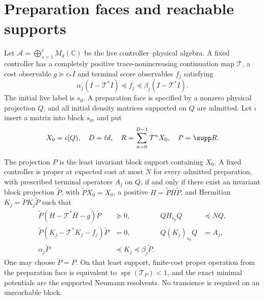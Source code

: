 \section{Preparation faces and reachable supports}
Let $\mathcal A=\bigoplus_{s=1}^{\ell}M_d(\mathbb C)$ be the live controller--physical algebra. A fixed controller has a completely positive trace-nonincreasing continuation map $\mathcal T$, a cost observable $g\succeq c_*I$ and terminal score observables $f_j$ satisfying
\[
 \alpha_j(I-\mathcal T^*I)\preccurlyeq f_j\preccurlyeq
 \beta_j(I-\mathcal T^*I).
\]
The initial live label is $s_0$. A preparation face is specified by a nonzero physical projection $Q$, and all initial density matrices supported on $Q$ are admitted. Let $\iota$ insert a matrix into block $s_0$, and put
\[
 X_0=\iota(Q),\quad D=\ell d,\quad R=\sum_{n=0}^{D-1}\mathcal T^nX_0,
 \quad P=\supp R.
\]
\begin{theorem}\label{thm:face}
The projection $P$ is the least invariant block support containing $X_0$. A fixed controller is proper at expected cost at most $N$ for every admitted preparation, with prescribed terminal operators $A_j$ on $Q$, if and only if there exist an invariant block projection $\widetilde P$, with $\widetilde P X_0=X_0$, a positive $H=\widetilde P H\widetilde P$, and Hermitian $K_j=\widetilde P K_j\widetilde P$ such that
\begin{align*}
 \widetilde P(H-\mathcal T^*H-g)\widetilde P&\succeq0,
 &QH_{s_0}Q&\preccurlyeq NQ,\\
 \widetilde P(K_j-\mathcal T^*K_j-f_j)\widetilde P&=0,
 &Q(K_j)_{s_0}Q&=A_j,\\
 \alpha_j\widetilde P&\preccurlyeq K_j\preccurlyeq\beta_j\widetilde P.
\end{align*}
One may choose $\widetilde P=P$. On that least support, finite-cost proper operation from the preparation face is equivalent to $\operatorname{spr}(\mathcal T_P)<1$, and the exact minimal potentials are the supported Neumann resolvents. No transience is required on an unreachable block.
\end{theorem}

